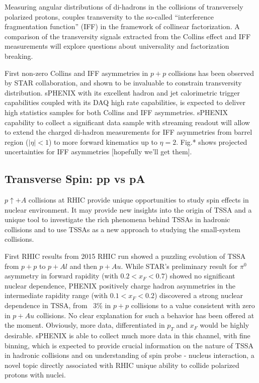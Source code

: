 Measuring angular distributions of di-hadrons in the collisions of transversely polarized protons, couples transversity to the so-called “interference fragmentation function” (IFF) in the framework of collinear factorization. A comparison of the transversity signals extracted from the Collins effect and IFF measurements will explore questions about universality and factorization breaking. 

First non-zero Collins and IFF asymmetries in $p+p$ collisions has been observed by STAR collaboration, and shown to be invaluable to constrain transversity distribution. sPHENIX with its excellent hadron and jet calorimetric trigger capabilities coupled with its DAQ high rate capabilities, is expected to deliver high statistics samples for both Collins and IFF asymmetries. sPHENIX capability to collect a significant data sample with streaming readout will allow to extend the charged di-hadron measurements for IFF asymmetries from barrel region ($|\eta|<1$) to more forward kinematics up to $\eta=2$. Fig.* shows projected uncertainties for IFF asymmetries [hopefully we'll get them].

\subsection {Transverse Spin: pp vs pA}

$p\uparrow+A$ collisions at RHIC provide unique opportunities to study spin effects in nuclear environment. It may provide new insights into the origin of TSSA and a unique tool to investigate the rich phenomena behind TSSAs in hadronic collisions and to use TSSAs as a new approach to studying the small-system collisions.

First RHIC results from 2015 RHIC run showed a puzzling evolution of TSSA from $p+p$ to $p+Al$ and then $p+Au$. While STAR's preliminary result for $\pi^{0}$ asymmetry in forward rapidity (with $0.2<x_F<0.7$) showed no significant nuclear dependence, PHENIX positively charge hadron asymmetries in the intermediate rapidity range (with $0.1<x_F<0.2$) discovered a strong nuclear dependence in TSSA, from ~3\% in $p+p$ collisions to a value consistent with zero in $p+Au$ collisions. No clear explanation for such a behavior has been offered at the moment. Obviously, more data, differentiated in $p_T$ and $x_F$ would be highly desirable. sPHENIX is able to collect much more data in this channel, with fine binning, which is expected to provide crucial information on the nature of TSSA in hadronic collisions and on understanding of spin probe - nucleus interaction, a novel topic directly associated with RHIC unique ability to collide polarized protons with nuclei.

